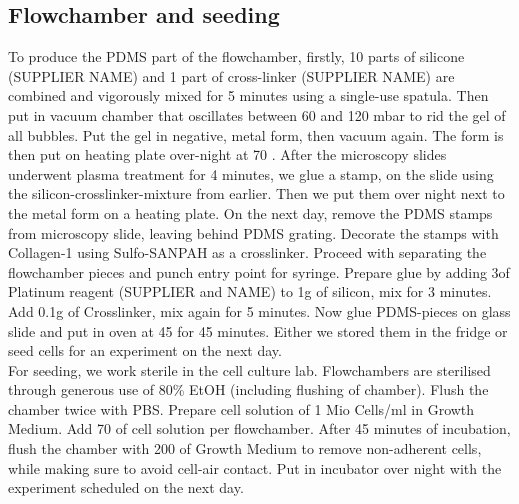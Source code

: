 \subsection{Flowchamber and seeding}
\label{sec:FluidicModel}
To produce the PDMS part of the flowchamber, firstly, 10 parts of silicone (SUPPLIER NAME) and 1 part of cross-linker (SUPPLIER NAME) are combined and vigorously mixed for 5 minutes using a single-use spatula. Then put in vacuum chamber that oscillates between 60 and 120 mbar to rid the gel of all bubbles. Put the gel in negative, metal form, then vacuum again. The form is then put on heating plate over-night at 70 \degC{}. After the microscopy slides underwent plasma treatment for 4 minutes, we glue a stamp, on the slide using the silicon-crosslinker-mixture from earlier. Then we put them over night next to the metal form on a heating plate. On the next day, remove the PDMS stamps from microscopy slide, leaving behind PDMS grating. Decorate the stamps with Collagen-1 using Sulfo-SANPAH as a crosslinker. Proceed with separating the flowchamber pieces and punch entry point for syringe. Prepare glue by adding 3\mul of Platinum reagent (SUPPLIER and NAME) to 1g of silicon, mix for 3 minutes. Add 0.1g of Crosslinker, mix again for 5 minutes. Now glue PDMS-pieces on glass slide and put in oven at 45 \degC{} for 45 minutes. Either we stored them in the fridge or seed cells for an experiment on the next day.\\
For seeding, we work sterile in the cell culture lab. Flowchambers are sterilised through generous use of 80\% EtOH (including flushing of chamber). Flush the chamber twice with PBS. Prepare cell solution of 1 Mio Cells/ml in Growth Medium. Add 70 \mul{} of cell solution per flowchamber. After 45 minutes of incubation, flush the chamber with 200\mul{} of Growth Medium to remove non-adherent cells, while making sure to avoid cell-air contact. Put in incubator over night with the experiment scheduled on the next day.

